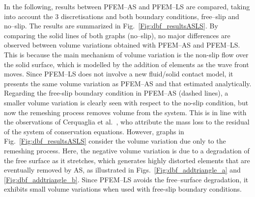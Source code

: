 \documentclass[final,3p,times]{elsarticle}
\begin{document}
In the following, results between PFEM--AS and PFEM--LS are compared, taking into account the 3 discretisations and both boundary conditions, free--slip and no--slip. The results are summarized in Fig.~\ref{Fig:dbf_resultsASLS}. By comparing the solid lines of both graphs (no--slip), no major differences are observed between volume variations obtained with PFEM--AS and PFEM--LS. This is because the main mechanism of volume variation is the non-slip flow over the solid surface, which is modelled by the addition of elements as the wave front moves. Since PFEM--LS does not involve a new fluid/solid contact model, it presents the same volume variation as PFEM--AS and that estimated analytically. Regarding the free-slip boundary condition in PFEM--AS (dashed lines), a smaller volume variation is clearly seen with respect to the no-slip condition, but now the remeshing process removes volume from the system. This is in line with the observations of Cerquaglia et al.~\citep{cerquaglia2017free}, who attribute the mass loss to the residual of the system of conservation equations. However, graphs in Fig.~\ref{Fig:dbf_resultsASLS} consider the volume variation due only to the remeshing process. Here, the negative volume variation is due to a degradation of the free surface as it stretches, which generates highly distorted elements that are eventually removed by AS, as illustrated in Figs.~\ref{Fig:dbf_addtriangle_a} and \ref{Fig:dbf_addtriangle_b}. Since PFEM--LS avoids the free--surface degradation, it exhibits small volume variations when used with free-slip boundary conditions.   
\end{document}

